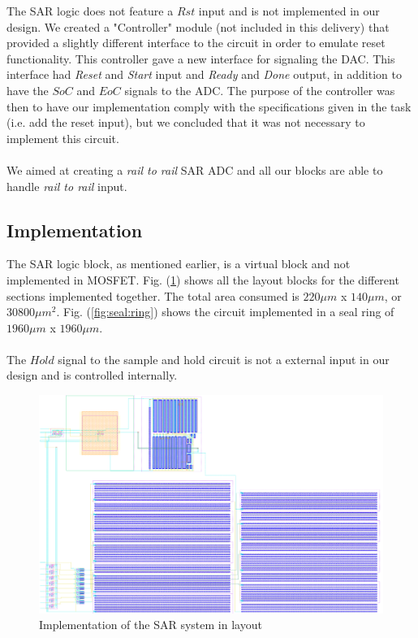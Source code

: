 \documentclass[english, 12pt, a4paper]{ifimaster}
\begin{document}
\noindent
The SAR logic does not feature a \(Rst\) input and is not implemented in our design. 
We created a "Controller" module (not included in this delivery) that provided a slightly different interface to the circuit in order to emulate reset functionality.
This controller gave a new interface for signaling the DAC.
This interface had \textit{Reset} and \textit{Start} input and \textit{Ready} and \textit{Done} output, in addition to have the \(SoC\) and \(EoC\) signals to the ADC.
The purpose of the controller was then to have our implementation comply with the specifications given in the task (i.e. add the reset input), but we concluded that it 
was not necessary to implement this circuit.\\
\\
We aimed at creating a \textit{rail to rail} SAR ADC and all our blocks are able to handle \textit{rail to rail} input.

\subsection{Implementation}
The SAR logic block, as mentioned earlier, is a virtual block and not implemented in MOSFET. 
Fig. (\ref{fig:implemented:sar:system}) shows all the layout blocks for the different sections
implemented together. The total area consumed is \(220 \mu m \) x \(140 \mu m\), or \(30 800 \mu m^2\). 
Fig. (\ref{fig:seal:ring}) shows the circuit implemented in a seal ring of \(1960 \mu m\) x 
\(1960 \mu m\). \\
\\
The \(Hold\) signal to the sample and hold circuit is not a external 
input in our design and is controlled internally. 

\begin{figure}[!ht]
 \centering
 \includegraphics[width=\textwidth]{img/layout/entire_design2}
 \caption{Implementation of the SAR system in layout}
 \label{fig:implemented:sar:system}
\end{figure}
\end{document}
